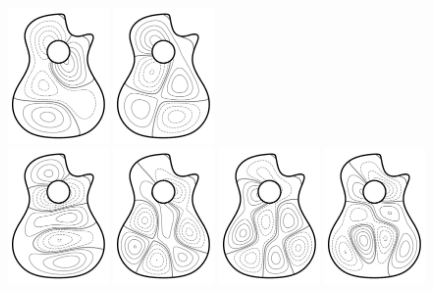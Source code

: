 \documentclass[presentation,aspectratio=43, 10pt]{beamer}
\begin{document}
\begin{frame}
\begin{columns}
\begin{column}{0.4\textwidth}
      \includegraphics[width=0.2\textwidth]{../pictures/guitar/cutaway-eigfunc4.pdf}%
      \includegraphics[width=0.2\textwidth]{../pictures/guitar/cutaway-eigfunc5.pdf}
      \\
      \includegraphics[width=0.2\textwidth]{../pictures/guitar/cutaway-eigfunc8.pdf}%
      \includegraphics[width=0.2\textwidth]{../pictures/guitar/cutaway-eigfunc9.pdf}%
      \includegraphics[width=0.2\textwidth]{../pictures/guitar/cutaway-eigfunc10.pdf}%
      \includegraphics[width=0.2\textwidth]{../pictures/guitar/cutaway-eigfunc11.pdf}%

\end{column}
\end{columns}
\end{frame}
\end{document}
